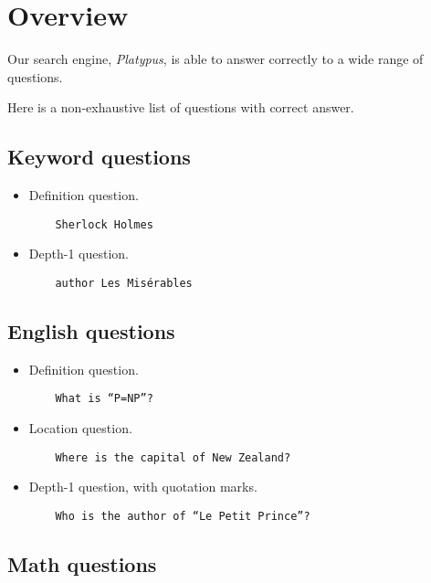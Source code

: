 \section{Overview}

Our search engine, \emph{Platypus}, is able to answer correctly to a wide range
of questions.

Here is a non-exhaustive list of questions with correct answer.

\subsection{Keyword questions}

\begin{itemize}
    \item Definition question.
    \begin{verbatim}
    Sherlock Holmes
    \end{verbatim}

    \item Depth-1 question.
    \begin{verbatim}
    author Les Misérables
    \end{verbatim}
\end{itemize}

\subsection{English questions}

\begin{itemize}
    \item Definition question.
    \begin{verbatim}
    What is “P=NP”?
    \end{verbatim}

    \item Location question.
    \begin{verbatim}
    Where is the capital of New Zealand?
    \end{verbatim}

    \item Depth-1 question, with quotation marks.
    \begin{verbatim}
    Who is the author of “Le Petit Prince”?
    \end{verbatim}
\end{itemize}

\subsection{Math questions}

